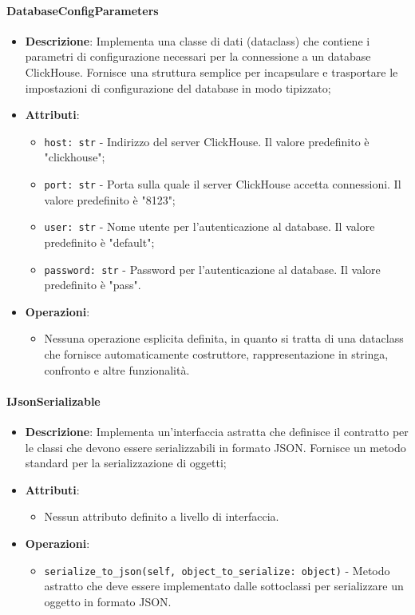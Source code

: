 \documentclass[10pt]{article}
\begin{document}
    \paragraph{DatabaseConfigParameters}
    \begin{itemize} 
    \item \textbf{Descrizione}: Implementa una classe di dati (dataclass) che contiene i parametri di configurazione necessari per la connessione a un database ClickHouse. Fornisce una struttura semplice per incapsulare e trasportare le impostazioni di configurazione del database in modo tipizzato;
    \item \textbf{Attributi}:
    \begin{itemize}
        \item \texttt{host: str} - Indirizzo del server ClickHouse. Il valore predefinito è "clickhouse";
        \item \texttt{port: str} - Porta sulla quale il server ClickHouse accetta connessioni. Il valore predefinito è "8123";
        \item \texttt{user: str} - Nome utente per l'autenticazione al database. Il valore predefinito è "default";
        \item \texttt{password: str} - Password per l'autenticazione al database. Il valore predefinito è "pass".
    \end{itemize}
    
    \item \textbf{Operazioni}:
    \begin{itemize}
        \item Nessuna operazione esplicita definita, in quanto si tratta di una dataclass che fornisce automaticamente costruttore, rappresentazione in stringa, confronto e altre funzionalità.
    \end{itemize}
    \end{itemize}

    
    \paragraph{IJsonSerializable}
    \begin{itemize} 
    \item \textbf{Descrizione}: Implementa un'interfaccia astratta che definisce il contratto per le classi che devono essere serializzabili in formato JSON. Fornisce un metodo standard per la serializzazione di oggetti;
    \item \textbf{Attributi}:
    \begin{itemize}
        \item Nessun attributo definito a livello di interfaccia.
    \end{itemize}
    
    \item \textbf{Operazioni}:
    \begin{itemize}
        \item \texttt{serialize\_to\_json(self, object\_to\_serialize: object)} - Metodo astratto che deve essere implementato dalle sottoclassi per serializzare un oggetto in formato JSON.
    \end{itemize}
    \end{itemize}
\end{document}
